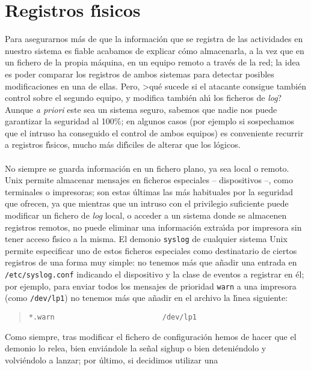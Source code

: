 \section{Registros f\'{\i}sicos}
Para asegurarnos m\'as de que la informaci\'on que se registra de las 
actividades en nuestro sistema es fiable acabamos de explicar c\'omo 
almacenarla, a la
vez que en un fichero de la propia m\'aquina, en un equipo remoto a trav\'es de
la red; la idea es poder comparar los registros de ambos sistemas para detectar
posibles modificaciones en una de ellas. Pero, >qu\'e sucede si el atacante
consigue tambi\'en control sobre el segundo equipo, y modifica tambi\'en 
ah\'{\i} los ficheros de {\it log}? Aunque {\it a priori} este sea un sistema
seguro, sabemos que nadie nos puede garantizar la seguridad al 100\%; en algunos
casos (por ejemplo si sospechamos que el intruso ha conseguido el control de 
ambos equipos) es conveniente recurrir a registros f\'{\i}sicos, mucho m\'as 
dif\'{\i}ciles de alterar que los l\'ogicos.\\
\\No siempre se guarda informaci\'on en un fichero plano, ya sea local o 
remoto.
Unix permite almacenar mensajes en ficheros especiales -- dispositivos --, como
terminales o impresoras; son estas \'ultimas las m\'as habituales por la 
seguridad que ofrecen, ya que mientras que un intruso con el privilegio 
suficiente puede modificar un fichero de {\it log} local, o acceder a un sistema
donde se almacenen registros remotos, no puede eliminar una informaci\'on
extra\'{\i}da por impresora sin tener acceso f\'{\i}sico a la misma. El demonio
{\tt syslog} de cualquier sistema Unix permite especificar uno de estos
ficheros especiales como destinatario de ciertos registros de una forma muy
simple: no tenemos m\'as que a\~nadir una entrada en {\tt /etc/syslog.conf}
indicando el dispositivo y la clase de eventos a registrar en \'el; por ejemplo,
para enviar todos los mensajes de prioridad {\tt warn} a una impresora (como
{\tt /dev/lp1}) no tenemos m\'as que a\~nadir en el archivo la l\'{\i}nea 
siguiente:
\begin{quote}
\begin{verbatim}
*.warn                         /dev/lp1
\end{verbatim}
\end{quote}
Como siempre, tras modificar el fichero de configuraci\'on hemos de hacer que
el demonio lo relea, bien envi\'andole la se\~nal {\sc sighup} o bien 
deteni\'endolo y volvi\'endolo a lanzar; por \'ultimo, si decidimos utilizar una
